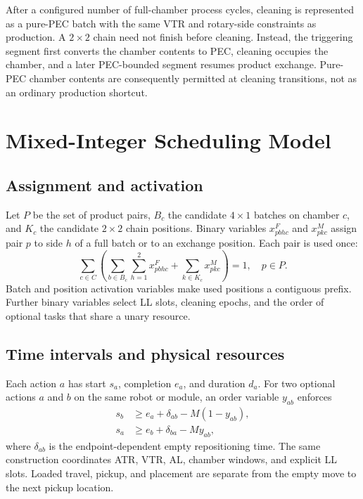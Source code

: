 \documentclass{ifacconf}
\begin{document}
After a configured number of full-chamber process cycles, cleaning is represented as a pure-PEC batch with the same VTR and rotary-side constraints as production. A $2\times2$ chain need not finish before cleaning. Instead, the triggering segment first converts the chamber contents to PEC, cleaning occupies the chamber, and a later PEC-bounded segment resumes product exchange. Pure-PEC chamber contents are consequently permitted at cleaning transitions, not as an ordinary production shortcut.

\section{Mixed-Integer Scheduling Model}

\subsection{Assignment and activation}

Let $P$ be the set of product pairs, $B_c$ the candidate $4\times1$ batches on chamber $c$, and $K_c$ the candidate $2\times2$ chain positions. Binary variables $x^F_{pbhc}$ and $x^M_{pkc}$ assign pair $p$ to side $h$ of a full batch or to an exchange position. Each pair is used once:
\begin{equation}
 \sum_{c\in C}\left(\sum_{b\in B_c}\sum_{h=1}^{2}x^F_{pbhc}
 +\sum_{k\in K_c}x^M_{pkc}\right)=1,\quad p\in P.
 \label{eq:assignment}
\end{equation}
Batch and position activation variables make used positions a contiguous prefix. Further binary variables select LL slots, cleaning epochs, and the order of optional tasks that share a unary resource.

\subsection{Time intervals and physical resources}

Each action $a$ has start $s_a$, completion $e_a$, and duration $d_a$. For two optional actions $a$ and $b$ on the same robot or module, an order variable $y_{ab}$ enforces
\begin{align}
s_b &\ge e_a+\delta_{ab}-M(1-y_{ab}),\nonumber\\
s_a &\ge e_b+\delta_{ba}-My_{ab},
\label{eq:resource}
\end{align}
where $\delta_{ab}$ is the endpoint-dependent empty repositioning time. The same construction coordinates ATR, VTR, AL, chamber windows, and explicit LL slots. Loaded travel, pickup, and placement are separate from the empty move to the next pickup location.
\end{document}
